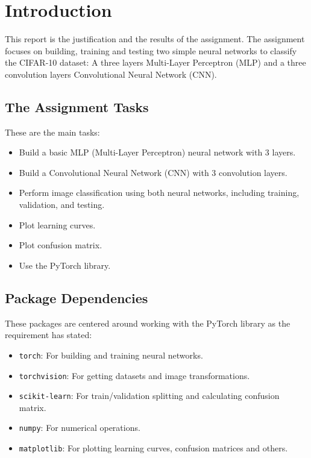 \documentclass{report}
\begin{document}
\chapter*{Introduction}
This report is the justification and the results of the assignment. The assignment focuses on building, training and 
testing two simple neural networks to classify the CIFAR-10 dataset: A three layers Multi-Layer Perceptron 
(MLP) and a three convolution layers Convolutional Neural Network (CNN).

\section*{The Assignment Tasks}
These are the main tasks:
\begin{itemize}
    \item Build a basic MLP (Multi-Layer Perceptron) neural network with 3 layers.
    \item Build a Convolutional Neural Network (CNN) with 3 convolution layers.
    \item Perform image classification using both neural networks, including training, validation, and testing.
    \item Plot learning curves.
    \item Plot confusion matrix.
    \item Use the PyTorch library.
\end{itemize}

\section*{Package Dependencies}
These packages are centered around working with the PyTorch library as the requirement has stated:
\begin{itemize}
    \item \texttt{torch}: For building and training neural networks.
    \item \texttt{torchvision}: For getting datasets and image transformations.
    \item \texttt{scikit-learn}: For train/validation splitting and calculating confusion matrix.
    \item \texttt{numpy}: For numerical operations.
    \item \texttt{matplotlib}: For plotting learning curves, confusion matrices and others.
\end{itemize}

\newpage
\tableofcontents
\newpage
\end{document}
